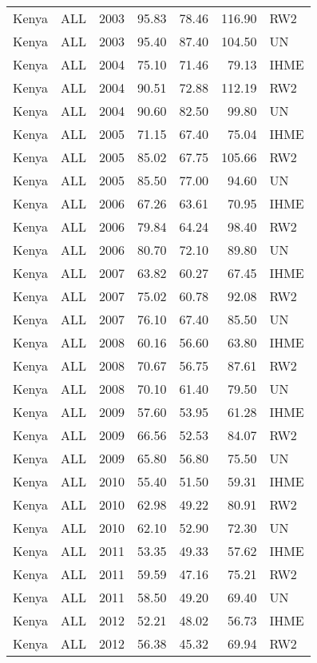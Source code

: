 \begin{longtable}{lllrrrl}
  Kenya & ALL & 2003 & 95.83 & 78.46 & 116.90 & RW2 \\ 
  Kenya & ALL & 2003 & 95.40 & 87.40 & 104.50 & UN \\ 
  Kenya & ALL & 2004 & 75.10 & 71.46 & 79.13 & IHME \\ 
  Kenya & ALL & 2004 & 90.51 & 72.88 & 112.19 & RW2 \\ 
  Kenya & ALL & 2004 & 90.60 & 82.50 & 99.80 & UN \\ 
  Kenya & ALL & 2005 & 71.15 & 67.40 & 75.04 & IHME \\ 
  Kenya & ALL & 2005 & 85.02 & 67.75 & 105.66 & RW2 \\ 
  Kenya & ALL & 2005 & 85.50 & 77.00 & 94.60 & UN \\ 
  Kenya & ALL & 2006 & 67.26 & 63.61 & 70.95 & IHME \\ 
  Kenya & ALL & 2006 & 79.84 & 64.24 & 98.40 & RW2 \\ 
  Kenya & ALL & 2006 & 80.70 & 72.10 & 89.80 & UN \\ 
  Kenya & ALL & 2007 & 63.82 & 60.27 & 67.45 & IHME \\ 
  Kenya & ALL & 2007 & 75.02 & 60.78 & 92.08 & RW2 \\ 
  Kenya & ALL & 2007 & 76.10 & 67.40 & 85.50 & UN \\ 
  Kenya & ALL & 2008 & 60.16 & 56.60 & 63.80 & IHME \\ 
  Kenya & ALL & 2008 & 70.67 & 56.75 & 87.61 & RW2 \\ 
  Kenya & ALL & 2008 & 70.10 & 61.40 & 79.50 & UN \\ 
  Kenya & ALL & 2009 & 57.60 & 53.95 & 61.28 & IHME \\ 
  Kenya & ALL & 2009 & 66.56 & 52.53 & 84.07 & RW2 \\ 
  Kenya & ALL & 2009 & 65.80 & 56.80 & 75.50 & UN \\ 
  Kenya & ALL & 2010 & 55.40 & 51.50 & 59.31 & IHME \\ 
  Kenya & ALL & 2010 & 62.98 & 49.22 & 80.91 & RW2 \\ 
  Kenya & ALL & 2010 & 62.10 & 52.90 & 72.30 & UN \\ 
  Kenya & ALL & 2011 & 53.35 & 49.33 & 57.62 & IHME \\ 
  Kenya & ALL & 2011 & 59.59 & 47.16 & 75.21 & RW2 \\ 
  Kenya & ALL & 2011 & 58.50 & 49.20 & 69.40 & UN \\ 
  Kenya & ALL & 2012 & 52.21 & 48.02 & 56.73 & IHME \\ 
  Kenya & ALL & 2012 & 56.38 & 45.32 & 69.94 & RW2 \\ 

\end{longtable}
